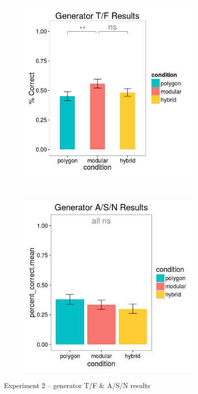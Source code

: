 \documentclass[man,mask,10pt]{apa6}
\begin{document}
\begin{figure}[H]
\centering
\begin{subfigure}[c]{0.3\textwidth}
\centering
\includegraphics[width=\textwidth]{figures/2/gen_TF_r.png}
\end{subfigure}
~
\begin{subfigure}[c]{0.3\textwidth}
\centering
\includegraphics[width=\textwidth]{figures/2/gen_ASN_r.png}
\end{subfigure}
\caption{Experiment 2 -- generator T/F \& A/S/N results}
\label{ex2_TFASN}
\end{figure}\noindent 
\end{document}
